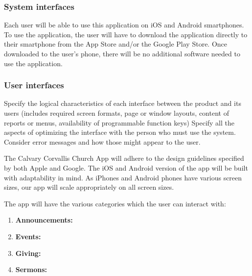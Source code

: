 \documentclass[letterpaper,10pt,draftclsnofoot,onecolumn,titlepage]{IEEEtran}
\begin{document}
	\subsubsection{System interfaces}
	Each user will be able to use this application on iOS and Android smartphones.
	To use the application, the user will have to download the application directly to their smartphone from the App Store and/or the Google Play Store.
	Once downloaded to the user's phone, there will be no additional software needed to use the application.

	\subsubsection{User interfaces}
	Specify the logical characteristics of each interface between the product and its users (includes required screen formats, page or window layouts, content of reports or menus, availability of programmable function keys)
	Specify all the aspects of optimizing the interface with the person who must use the system.
	Consider error messages and how those might appear to the user.

	The Calvary Corvallis Church App will adhere to the design guidelines specified by both Apple and Google.
	The iOS and Android version of the app will be built with adaptability in mind.
	As iPhones and Android phones have various screen sizes, our app will scale appropriately on all screen sizes.

	The app will have the various categories which the user can interact with:
	\begin{enumerate}
		\item \textbf{Announcements:}
		\item \textbf{Events:}
		\item \textbf{Giving:}
		\item \textbf{Sermons:}
	\end{enumerate}
		
\end{document}
